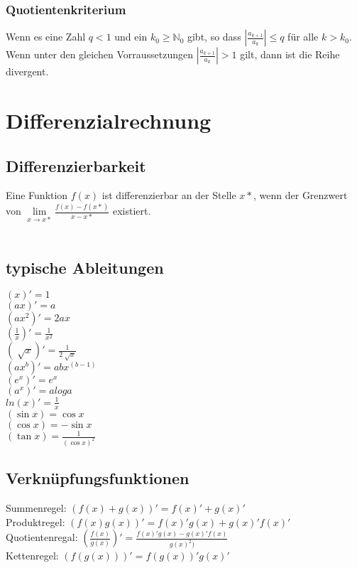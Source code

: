 \documentclass[a4paper,landscape, 11pt]{article}
\newcommand{\limFromTo}[2]{ \lim\limits_{#2 \rightarrow #1}}
\begin{document}
\begin{multicols}{4}
\begin{small}
            \subsubsection{Quotientenkriterium}
                Wenn es eine Zahl $q < 1$ und ein $k_0 \ge \mathbb{N}_0$ gibt, so dass $\left|\frac{a_{k+1}}{a_k} \right| \le q$ für alle $k > k_0.$ \\
                Wenn unter den gleichen Vorraussetzungen $\left|\frac{a_{k+1}}{a_k} \right| > 1$ gilt, dann ist die Reihe divergent.
    \section{Differenzialrechnung}
    	\subsection{Differenzierbarkeit}
                  Eine Funktion $f(x)$ ist differenzierbar an der Stelle $x*$, wenn der Grenzwert von $\limFromTo{x*}{x} \frac{f(x) - f(x*)}{x - x*}$ existiert. 
                  \\ \\
    	\subsection{typische Ableitungen}
    	   \begin{multicols}{2}		
    	   		$(x)' = 1$ \\
    			$(ax)' = a$ \\
    			$(ax^2)' = 2ax$ \\
    			$(\frac{1}{x})' = \frac{1}{x^2}$ \\
    			$(\sqrt[]{x})' = \frac{1}{2\sqrt[]{x}}$ \\
    			$(ax^b)' = abx^(b-1)$ \\
    			$(e^x)' = e^x $ \\
    			$(a^x)' = aloga $ \\
    			$ln(x)' = \frac{1}{x}$ \\
    		 	$(\sin x) = \cos x$ \\
    		 	$(\cos x) = -\sin x$ \\
    		 	$(\tan x) = \frac{1}{(\cos x)^2}$ \\ 
    		 	\end{multicols}
      \subsection{Verknüpfungsfunktionen}
      			Summenregel: $(f(x) + g(x))' = f(x)' + g(x)' $ \\ 
      			Produktregel: $(f(x)g(x))' = f(x)'g(x)+g(x)'f(x)' $ \\
      			Quotientenregal: $(\frac{f(x)}{g(x)})' = \frac{f(x)'g(x)-g(x)'f(x)}{g(x)^2)}$ \\
      			Kettenregel: 
      			$(f(g(x)))' = f(g(x))'g(x)'$ \\
      		 

\end{small}
\end{multicols}
\end{document}

